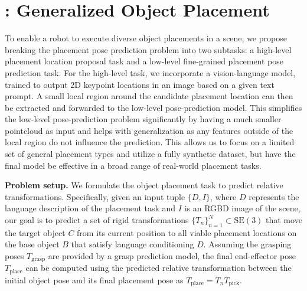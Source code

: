 \section{\ourmethod: Generalized Object Placement}




To enable a robot to execute diverse object placements in a scene, we propose breaking the placement pose prediction problem into two subtasks: a high-level placement location proposal task and a low-level fine-grained placement pose prediction task. For the high-level task, we incorporate a vision-language model, trained to output 2D keypoint locations in an image based on a given text prompt.
A small local region around the candidate placement location can then be extracted and forwarded to the low-level pose-prediction model.
This simplifies the low-level pose-prediction problem significantly by having a much smaller pointcloud as input and helps with generalization as any features outside of the local region do not influence the prediction.
This allows us to focus on a limited set of general placement types and utilize a fully synthetic dataset, but have the final model be effective in a broad range of real-world placement tasks.

\noindent \textbf{Problem setup.}
We formulate the object placement task to predict relative transformations. Specifically, given an input tuple \(\{D, I\}\), where \( D \) represents the language description of the placement task and \( I \) is an RGBD image of the scene, our goal is to predict a set of rigid transformations \( \{T_n\}_{n=1}^{N} \subset \mathrm{SE}(3) \) that move the target object \( C \) from its current position to all viable placement locations on the base object \( B \) that satisfy language conditioning \( D \).  Assuming the grasping poses \( T_{\text{grasp}} \) are provided by a grasp prediction model, the final end-effector pose \( T_{\text{place}} \) can be computed using the predicted relative transformation between the initial object pose and its final placement pose as $T_{\text{place}} = T_n T_{\text{pick}}.$

